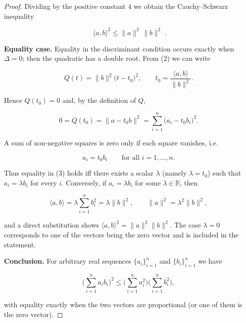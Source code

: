 \begin{proof}
Dividing by the positive constant \(4\) we obtain the Cauchy–Schwarz inequality  

\[
\boxed{\;\langle a,b\rangle^{2}\le \|a\|^{2}\,\|b\|^{2}\;}. \tag{3}
\]

\medskip\noindent\textbf{Equality case.}  
Equality in the discriminant condition occurs exactly when \(\Delta=0\); then the quadratic has a double root. From (2) we can write  

\[
Q(t)=\|b\|^{2}\bigl(t-t_{0}\bigr)^{2},
\qquad
t_{0}=\frac{\langle a,b\rangle}{\|b\|^{2}} .
\]

Hence \(Q(t_{0})=0\) and, by the definition of \(Q\),

\[
0=Q(t_{0})=\|a-t_{0}b\|^{2}
      =\sum_{i=1}^{n}\bigl(a_{i}-t_{0}b_{i}\bigr)^{2}.
\]

A sum of non‑negative squares is zero only if each square vanishes, i.e.  

\[
a_{i}=t_{0}b_{i}\qquad\text{for all }i=1,\dots ,n.
\]

Thus equality in (3) holds iff there exists a scalar \(\lambda\) (namely \(\lambda=t_{0}\)) such that \(a_{i}=\lambda b_{i}\) for every \(i\).  
Conversely, if \(a_{i}=\lambda b_{i}\) for some \(\lambda\in\mathbb{R}\), then  

\[
\langle a,b\rangle =\lambda\sum_{i=1}^{n}b_{i}^{2}= \lambda\|b\|^{2},\qquad
\|a\|^{2}= \lambda^{2}\|b\|^{2},
\]

and a direct substitution shows \(\langle a,b\rangle^{2}= \|a\|^{2}\|b\|^{2}\).  
The case \(\lambda=0\) corresponds to one of the vectors being the zero vector and is included in the statement.

\medskip\noindent\textbf{Conclusion.}  
For arbitrary real sequences \(\{a_{i}\}_{i=1}^{n}\) and \(\{b_{i}\}_{i=1}^{n}\) we have  

\[
\biggl(\sum_{i=1}^{n}a_{i}b_{i}\biggr)^{2}
\le
\biggl(\sum_{i=1}^{n}a_{i}^{2}\biggr)
\biggl(\sum_{i=1}^{n}b_{i}^{2}\biggr),
\]

with equality exactly when the two vectors are proportional (or one of them is the zero vector).  
\end{proof}